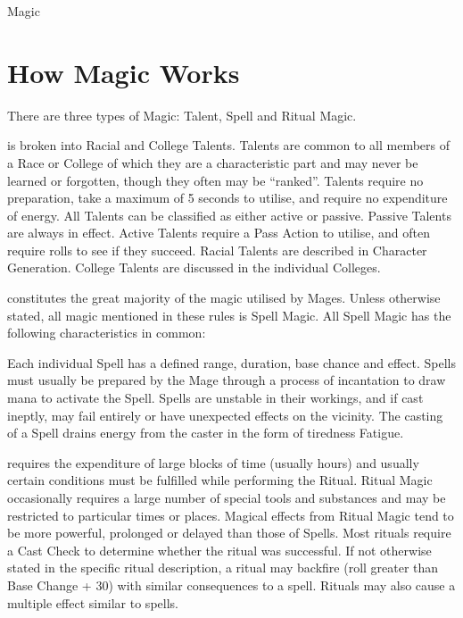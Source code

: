 \begin{Chapter}{Magic}
\section{How Magic Works}

There  are  three  types  of  Magic:  Talent,  Spell  and 
Ritual Magic. 

\begin{Description}
  
\item[Talent Magic] is broken into Racial and College Talents.
  Talents are common to all members of a Race or College of which they
  are a characteristic part and may never be learned or forgotten,
  though they often may be “ranked”.  Talents require no preparation,
  take a maximum of 5 seconds to utilise, and require no expenditure
  of energy.  All Talents can be classified as either active or
  passive.  Passive Talents are always in effect. Active Talents
  require a Pass Action to utilise, and often require rolls to see if
  they succeed.  Racial Talents are described in Character
  Generation. College Talents are discussed in the individual
  Colleges.

\item[Spell Magic] constitutes the great majority of the magic
  utilised by Mages.  Unless otherwise stated, all magic mentioned in
  these rules is Spell Magic.  All Spell Magic has the following
  characteristics in common:

  Each individual Spell has a defined range, duration, base chance and
  effect. Spells must usually be prepared by the Mage through a
  process of incantation to draw mana to activate the Spell.  Spells
  are unstable in their workings, and if cast ineptly, may fail
  entirely or have unexpected effects on the vicinity. The casting of
  a Spell drains energy from the caster in the form of tiredness
  Fatigue.

\item[Ritual Magic] requires the expenditure of large blocks of time
  (usually hours) and usually certain conditions must be fulfilled
  while performing the Ritual.  Ritual Magic occasionally requires a
  large number of special tools and substances and may be restricted
  to particular times or places.  Magical effects from Ritual Magic
  tend to be more powerful, prolonged or delayed than those of Spells.
  Most rituals require a Cast Check to determine whether the ritual
  was successful.  If not otherwise stated in the specific ritual
  description, a ritual may backfire (roll greater than Base Change +
  30) with similar consequences to a spell.  Rituals may also cause a
  multiple effect similar to spells.


\end{Description}
\end{Chapter}
